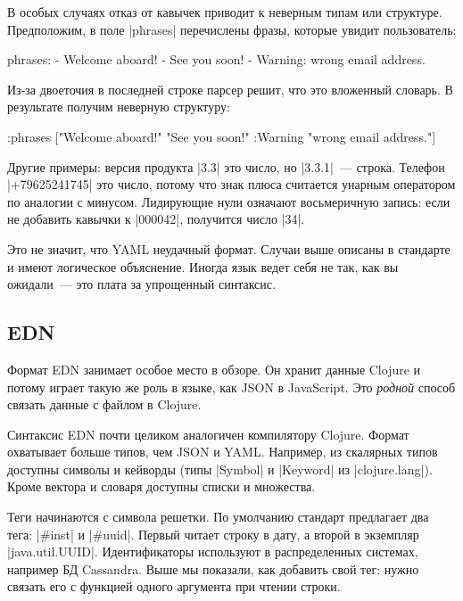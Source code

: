 В особых случаях отказ от кавычек приводит к неверным типам или
структуре. Предположим, в поле \spverb|phrases| перечислены фразы, которые
увидит пользователь:

\begin{english}
  \begin{yaml}
phrases:
  - Welcome aboard!
  - See you soon!
  - Warning: wrong email address.
  \end{yaml}
\end{english}

Из-за двоеточия в последней строке парсер решит, что это вложенный словарь. В
результате получим неверную структуру:

\begin{english}
  \begin{clojure}
{:phrases
 ["Welcome aboard!"
  "See you soon!"
  {:Warning "wrong email address."}]}
  \end{clojure}
\end{english}

Другие примеры: версия продукта \spverb|3.3| это число, но \spverb|3.3.1|~---
строка. Телефон \spverb|+79625241745| это число, потому что знак плюса считается
унарным оператором по аналогии с минусом. Лидирующие нули означают восьмеричную
запись: если не добавить кавычки к \spverb|000042|, получится число \spverb|34|.

Это не значит, что YAML неудачный формат. Случаи выше описаны в стандарте и
имеют логическое объяснение. Иногда язык ведет себя не так, как вы ожидали~---
это плата за упрощенный синтаксис.

\subsection{EDN}

Формат EDN занимает особое место в обзоре. Он хранит данные Clojure и потому
играет такую же роль в языке, как JSON в JavaScript. Это \emph{родной} способ
связать данные с файлом в Clojure.

Синтаксис EDN почти целиком аналогичен компилятору Clojure. Формат охватывает
больше типов, чем JSON и YAML. Например, из скалярных типов доступны символы и
кейворды (типы \spverb|Symbol| и \spverb|Keyword| из
\spverb|clojure.lang|). Кроме вектора и словаря доступны списки и множества.

Теги начинаются с символа решетки. По умолчанию стандарт предлагает два тега:
\spverb|#inst| и \spverb|#uuid|. Первый читает строку в дату, а второй в
экземпляр \spverb|java.util.UUID|. Идентификаторы используют в распределенных
системах, например БД Cassandra. Выше мы показали, как добавить свой тег: нужно
связать его с функцией одного аргумента при чтении строки.

